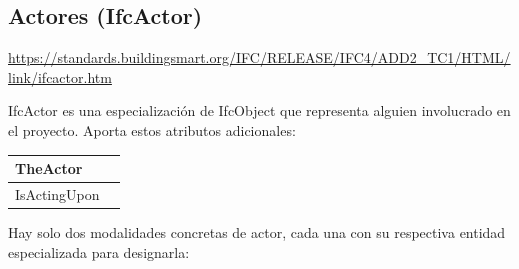 \documentclass[spanish,12pt,a4paper,final,oneside]{book}
\begin{document}
\subsection{Actores (IfcActor)}
\url{https://standards.buildingsmart.org/IFC/RELEASE/IFC4/ADD2_TC1/HTML/link/ifcactor.htm}

IfcActor es una especialización de IfcObject que representa alguien involucrado en el proyecto. Aporta estos atributos adicionales:

\begin{longtable}{|p{2.5cm} p{11cm}|}
\hline
TheActor & 
\\[0.1cm] \hline
IsActingUpon & 
\\[0.1cm] \hline
\end{longtable}

Hay solo dos modalidades concretas de actor, cada una con su respectiva entidad especializada para designarla:
\end{document}
